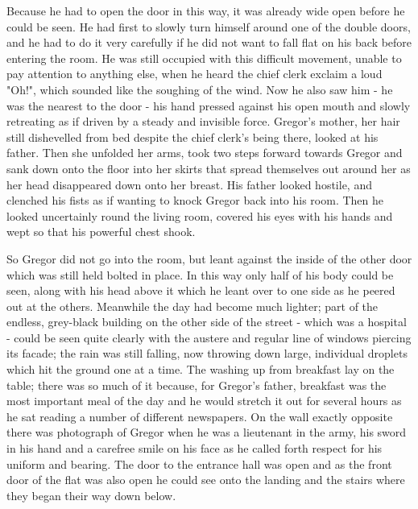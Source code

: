 Because he had to open the door in this way, it was already wide open before he could be seen. He had first to slowly turn himself around one of the double doors, and he had to do it very carefully if he did not want to fall flat on his back before entering the room. He was still occupied with this difficult movement, unable to pay attention to anything else, when he heard the chief clerk exclaim a loud "Oh!", which sounded like the soughing of the wind. Now he also saw him - he was the nearest to the door - his hand pressed against his open mouth and slowly retreating as if driven by a steady and invisible force. Gregor's mother, her hair still dishevelled from bed despite the chief clerk's being there, looked at his father. Then she unfolded her arms, took two steps forward towards Gregor and sank down onto the floor into her skirts that spread themselves out around her as her head disappeared down onto her breast. His father looked hostile, and clenched his fists as if wanting to knock Gregor back into his room. Then he looked uncertainly round the living room, covered his eyes with his hands and wept so that his powerful chest shook.

So Gregor did not go into the room, but leant against the inside of the other door which was still held bolted in place. In this way only half of his body could be seen, along with his head above it which he leant over to one side as he peered out at the others. Meanwhile the day had become much lighter; part of the endless, grey-black building on the other side of the street - which was a hospital - could be seen quite clearly with the austere and regular line of windows piercing its facade; the rain was still falling, now throwing down large, individual droplets which hit the ground one at a time. The washing up from breakfast lay on the table; there was so much of it because, for Gregor's father, breakfast was the most important meal of the day and he would stretch it out for several hours as he sat reading a number of different newspapers. On the wall exactly opposite there was photograph of Gregor when he was a lieutenant in the army, his sword in his hand and a carefree smile on his face as he called forth respect for his uniform and bearing. The door to the entrance hall was open and as the front door of the flat was also open he could see onto the landing and the stairs where they began their way down below.

